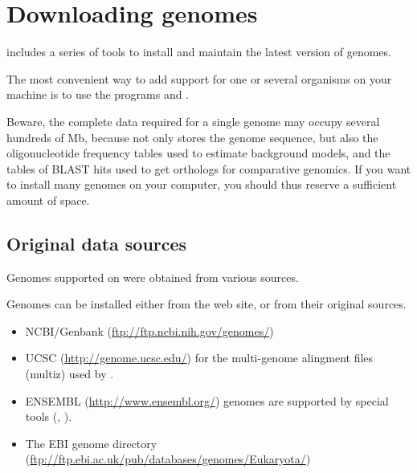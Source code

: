 
\chapter{Downloading genomes}
\label{downloading_genomes}

\RSAT includes a series of tools to install and maintain the latest
version of genomes.

The most convenient way to add support for one or several organisms on
your machine is to use the programs  and
.

Beware, the complete data required for a single genome may occupy
several hundreds of Mb, because \RSAT not only stores the genome
sequence, but also the oligonucleotide frequency tables used to
estimate background models, and the tables of BLAST hits used to get
orthologs for comparative genomics. If you want to install many
genomes on your computer, you should thus reserve a sufficient amount
of space.

\section{Original data sources}

Genomes supported on \RSAT were obtained from various sources.

Genomes can be installed either from the \RSAT web site, or from their
original sources.  

\begin{itemize}
\item NCBI/Genbank (\url{ftp://ftp.ncbi.nih.gov/genomes/})

\item UCSC (\url{http://genome.ucsc.edu/}) for the multi-genome
  alingment files (multiz) used by .

\item ENSEMBL (\url{http://www.ensembl.org/}) genomes are supported by
  special tools (,
  ).


\item The EBI genome directory
  (\url{ftp://ftp.ebi.ac.uk/pub/databases/genomes/Eukaryota/})

\end{itemize}

